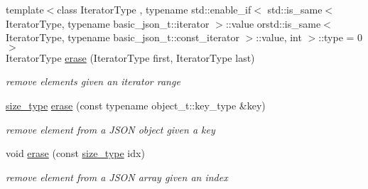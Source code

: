 \begin{DoxyCompactItemize}
{\footnotesize template$<$class Iterator\+Type , typename std\+::enable\+\_\+if$<$ std\+::is\+\_\+same$<$ Iterator\+Type, typename basic\+\_\+json\+\_\+t\+::iterator $>$\+::value orstd\+::is\+\_\+same$<$ Iterator\+Type, typename basic\+\_\+json\+\_\+t\+::const\+\_\+iterator $>$\+::value, int $>$\+::type  = 0$>$ }\\Iterator\+Type \hyperlink{classnlohmann_1_1basic__json_a4b3f7eb2d4625d95a51fbbdceb7c5f39}{erase} (Iterator\+Type first, Iterator\+Type last)
\begin{DoxyCompactList}\small\item\em remove elements given an iterator range \end{DoxyCompactList}\item 
\hyperlink{classnlohmann_1_1basic__json_a39f2cd0b58106097e0e67bf185cc519b}{size\+\_\+type} \hyperlink{classnlohmann_1_1basic__json_a2f8484d69c55d8f2a9697a7bec29362a}{erase} (const typename object\+\_\+t\+::key\+\_\+type \&key)
\begin{DoxyCompactList}\small\item\em remove element from a J\+S\+ON object given a key \end{DoxyCompactList}\item 
void \hyperlink{classnlohmann_1_1basic__json_a88cbcefe9a3f4d294bed0653550a5cb9}{erase} (const \hyperlink{classnlohmann_1_1basic__json_a39f2cd0b58106097e0e67bf185cc519b}{size\+\_\+type} idx)
\begin{DoxyCompactList}\small\item\em remove element from a J\+S\+ON array given an index \end{DoxyCompactList}\end{DoxyCompactItemize}
